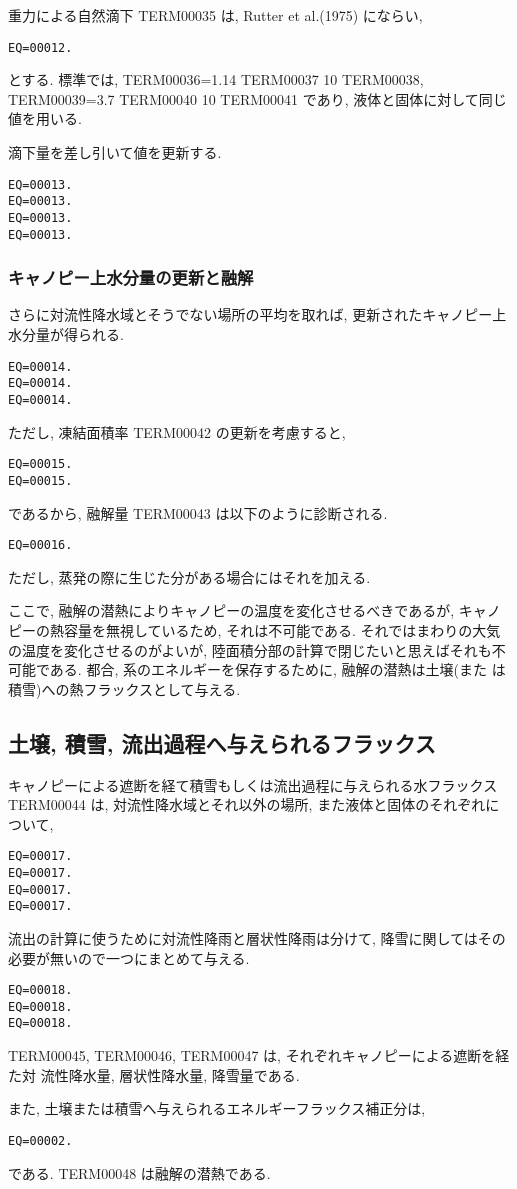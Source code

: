 重力による自然滴下 TERM00035 は, Rutter et al.(1975) にならい,
\begin{verbatim}
EQ=00012.
\end{verbatim}
とする. 標準では, TERM00036=1.14 TERM00037 10 TERM00038,
TERM00039=3.7 TERM00040 10 TERM00041 であり, 液体と固体に対して同じ値を用いる.

滴下量を差し引いて値を更新する.
\begin{verbatim}
EQ=00013.
EQ=00013.
EQ=00013.
EQ=00013.
\end{verbatim}

\subsubsection{キャノピー上水分量の更新と融解}

さらに対流性降水域とそうでない場所の平均を取れば, 更新されたキャノピー上
水分量が得られる.
\begin{verbatim}
EQ=00014.
EQ=00014.
EQ=00014.
\end{verbatim}

ただし, 凍結面積率 TERM00042 の更新を考慮すると,
\begin{verbatim}
EQ=00015.
EQ=00015.
\end{verbatim}
であるから, 融解量 TERM00043 は以下のように診断される.
\begin{verbatim}
EQ=00016.
\end{verbatim}
ただし, 蒸発の際に生じた分がある場合にはそれを加える.

ここで, 融解の潜熱によりキャノピーの温度を変化させるべきであるが, キャノ
ピーの熱容量を無視しているため, それは不可能である. それではまわりの大気
の温度を変化させるのがよいが, 陸面積分部の計算で閉じたいと思えばそれも不
可能である. 都合, 系のエネルギーを保存するために, 融解の潜熱は土壌(また
は積雪)への熱フラックスとして与える.

\subsection{土壌, 積雪, 流出過程へ与えられるフラックス}

キャノピーによる遮断を経て積雪もしくは流出過程に与えられる水フラックス
TERM00044 は, 対流性降水域とそれ以外の場所, また液体と固体のそれぞれについて,
\begin{verbatim}
EQ=00017.
EQ=00017.
EQ=00017.
EQ=00017.
\end{verbatim}

流出の計算に使うために対流性降雨と層状性降雨は分けて, 降雪に関してはその
必要が無いので一つにまとめて与える.
\begin{verbatim}
EQ=00018.
EQ=00018.
EQ=00018.
\end{verbatim}
TERM00045, TERM00046, TERM00047 は, それぞれキャノピーによる遮断を経た対
流性降水量, 層状性降水量, 降雪量である.

また, 土壌または積雪へ与えられるエネルギーフラックス補正分は,
\begin{verbatim}
EQ=00002.
\end{verbatim}
である. TERM00048 は融解の潜熱である.
